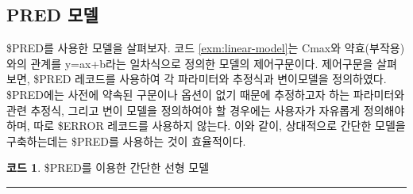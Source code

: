 \documentclass[
  10pt,
  krantz2,
  a4paper]{krantz}
\newenvironment{Shaded}{\begin{snugshade}}{\end{snugshade}}
\newcommand{\DecValTok}[1]{\textcolor[rgb]{0.00,0.00,0.81}{#1}}
\newcommand{\FloatTok}[1]{\textcolor[rgb]{0.00,0.00,0.81}{#1}}
\newcommand{\KeywordTok}[1]{\textcolor[rgb]{0.13,0.29,0.53}{\textbf{#1}}}
\newcommand{\NormalTok}[1]{#1}
\newcommand{\OperatorTok}[1]{\textcolor[rgb]{0.81,0.36,0.00}{\textbf{#1}}}
\newcommand{\StringTok}[1]{\textcolor[rgb]{0.31,0.60,0.02}{#1}}
\theoremstyle{definition}
\theoremstyle{definition}
\newtheorem{example}{코드}[chapter]
\theoremstyle{definition}
\theoremstyle{remark}
\begin{document}
\hypertarget{pred-uxbaa8uxb378}{%
\subsection{PRED 모델}\label{pred-uxbaa8uxb378}}

\$PRED를 사용한 모델을 살펴보자. 코드 \ref{exm:linear-model}는 Cmax와 약효(부작용)와의 관계를 y=ax+b라는 일차식으로 정의한 모델의 제어구문이다. 제어구문을 살펴보면, \$PRED 레코드를 사용하여 각 파라미터와 추정식과 변이모델을 정의하였다. \$PRED에는 사전에 약속된 구문이나 옵션이 없기 때문에 추정하고자 하는 파라미터와 관련 추정식, 그리고 변이 모델을 정의하여야 할 경우에는 사용자가 자유롭게 정의해야 하며, 따로 \$ERROR 레코드를 사용하지 않는다. 이와 같이, 상대적으로 간단한 모델을 구축하는데는 \$PRED를 사용하는 것이 효율적이다.

\begin{example}
\protect\hypertarget{exm:linear-model}{}{\label{exm:linear-model} }\$PRED를 이용한 간단한 선형 모델
\end{example}

\begin{Shaded}
\end{Shaded}

\begin{center}\rule{0.5\linewidth}{0.5pt}\end{center}
\end{document}
